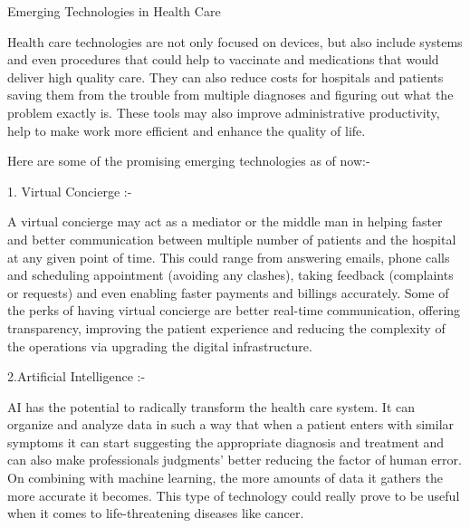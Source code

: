 \documentclass[12pt]{article}
\begin{document}
\begin{Huge}
\centering
Emerging Technologies in Health Care
\end{Huge}
\linebreak
\begin{large}
Health care technologies are not only focused on devices, but also include systems and even procedures that could help to vaccinate and medications that would deliver high quality care. They can also reduce costs for hospitals and patients saving them from the trouble from multiple diagnoses and figuring out what the problem exactly is. These tools may also improve administrative productivity, help to make work more efficient and enhance the quality of life.
\linebreak

Here are some of the promising emerging technologies as of now:-
\linebreak


\begin{Large}
1. Virtual Concierge :- 
\end{Large}
\linebreak
A virtual concierge may act as a mediator or the middle man in helping faster and better communication between multiple number of patients and the hospital at any given point of time. This could range from answering emails, phone calls and scheduling appointment (avoiding any clashes), taking feedback (complaints or requests) and even enabling faster payments and billings accurately. Some of the perks of having virtual concierge are better real-time communication, offering transparency, improving the patient experience and reducing the complexity of the operations via upgrading the digital infrastructure.
\linebreak


\begin{Large}
2.Artificial Intelligence :-
\end{Large}
\linebreak
AI has the potential to radically transform the health care system. It can organize and analyze data in such a way that when a patient enters with similar symptoms it can start suggesting the appropriate diagnosis and treatment and can also make professionals judgments' better reducing the factor of human error. On combining with machine learning, the more amounts of data it gathers the more accurate it becomes. This type of technology could really prove to be useful when it comes to life-threatening diseases like cancer.
\linebreak



\end{large}
\end{document}
